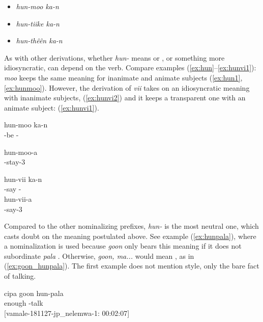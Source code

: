 \begin{itemize}
	\item \textit{hun-moo ka-n}  
	\item \textit{hun-tiike ka-n}  
	\item \textit{hun-thêên ka-n}  
\end{itemize}

As with other derivations, whether \textit{hun-} means  or , or something more idiosyncratic, can depend on the verb. Compare examples (\ref{ex:hun}--\ref{ex:hunvi1}): \textit{moo}  keeps the same meaning for inanimate and animate subjects (\ref{ex:hun1}, \ref{ex:hunmoo}). However, the derivation of \textit{vii}  takes on an idiosyncratic meaning with inanimate subjects,  (\ref{ex:hunvi2}) and it keeps a transparent one with an animate subject:  (\ref{ex:hunvi1}).


\ea \label{ex:hun}
\label{ex:hun1}
	\gll hun-moo ka-n\\
	 -be -\\
	\glt {}
	\z
	
	
	\ea\label{ex:hunmoo}
	\gll hun-moo-a\\
	 -stay-3\\
	\glt {}
	\z
	
	\ea\label{ex:hunvi2}
	\gll hun-vii ka-n \\
	 -say -\\
	\glt {}
\z
\ea\label{ex:hunvi1}
	\gll hun-vii-a\\
	 -say-3\\
	\glt {}
	\z
 
Compared to the other nominalizing prefixes, \textit{hun-} is the most neutral one, which casts doubt on the  meaning postulated above. See example (\ref{ex:hunpala}), where a nominalization is used because \textit{goon}  only bears this meaning if it does not subordinate \textit{pala} . Otherwise, \textit{goon, ma...} would mean , as in (\ref{ex:goon_hunpala}). The first example does not mention style, only the bare fact of talking. 

\ea
\label{ex:hunpala}
\gll cipa goon hun-pala\\
  enough -talk\\
\glt {} {[vamale-181127-jp\_nelemwa-1: 00:02:07]}
\z


